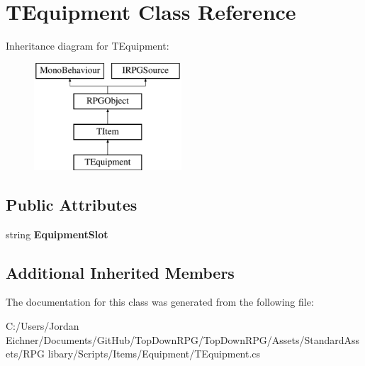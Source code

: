 \hypertarget{class_t_equipment}{}\section{T\+Equipment Class Reference}
\label{class_t_equipment}
Inheritance diagram for T\+Equipment\+:\begin{figure}[H]
\begin{center}
\leavevmode
\includegraphics[height=4.000000cm]{class_t_equipment}
\end{center}
\end{figure}
\subsection*{Public Attributes}
\begin{DoxyCompactItemize}
\item 
\hypertarget{class_t_equipment_a0649573d41f70f840da2b3888af650b3}{}string {\bfseries Equipment\+Slot}\label{class_t_equipment_a0649573d41f70f840da2b3888af650b3}

\end{DoxyCompactItemize}
\subsection*{Additional Inherited Members}


The documentation for this class was generated from the following file\+:\begin{DoxyCompactItemize}
\item 
C\+:/\+Users/\+Jordan Eichner/\+Documents/\+Git\+Hub/\+Top\+Down\+R\+P\+G/\+Top\+Down\+R\+P\+G/\+Assets/\+Standard\+Assets/\+R\+P\+G libary/\+Scripts/\+Items/\+Equipment/T\+Equipment.\+cs\end{DoxyCompactItemize}
